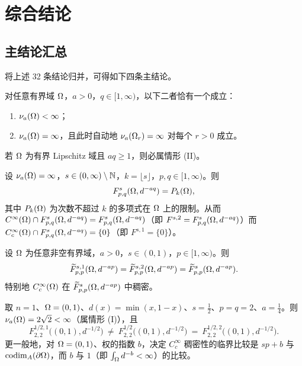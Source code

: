 \section{综合结论}\label{sec:concl}

\subsection{主结论汇总}

将上述 32 条结论归并，可得如下四条主结论。

\begin{theorem}\label{thm:main-dichotomy}
对任意有界域 $\Omega$，$a>0$，$q\in[1,\infty)$，以下二者恰有一个成立：
\begin{enumerate}[label=\textup{(\Roman*)}]
\item $\nu_{a}(\Omega)<\infty$；
\item $\nu_{a}(\Omega)=\infty$，且此时自动地 $\nu_{a}(\Omega_{r})=\infty$ 对每个 $r>0$ 成立。
\end{enumerate}
若 $\Omega$ 为有界 Lipschitz 域且 $aq\ge1$，则必属情形 (II)。
\end{theorem}

\begin{theorem}\label{thm:main-degen}
设 $\nu_{a}(\Omega)=\infty$，$s\in(0,\infty)\setminus\mathbb{N}$，$k=\lfloor s\rfloor$，$p,q\in[1,\infty)$。则
\[
  F^{s}_{p,q}(\Omega,d^{-aq})=P_k(\Omega),
\]
其中 $P_k(\Omega)$ 为次数不超过 $k$ 的多项式在 $\Omega$ 上的限制。从而
$C^\infty(\Omega)\cap F^{s}_{p,q}(\Omega,d^{-aq})=F^{s}_{p,q}(\Omega,d^{-aq})$（即 $F^{s,2}=F^{s}_{p,q}(\Omega,d^{-aq})$）而
$C_c^\infty(\Omega)\cap F^{s}_{p,q}(\Omega,d^{-aq})=\{0\}$（即 $F^{s,1}=\{0\}$）。
\end{theorem}

\begin{theorem}\label{thm:main-strength}
设 $\Omega$ 为任意非空有界域，$a>0$，$s\in(0,1)$，$p\in[1,\infty)$。则
\[
  \widetilde F^{s,1}_{p,p}(\Omega,d^{-ap})=\widetilde F^{s,2}_{p,p}(\Omega,d^{-ap})
  =\widetilde F^s_{p,p}(\Omega,d^{-ap}).
\]
特别地 $C_c^\infty(\Omega)$ 在 $\widetilde F^s_{p,p}(\Omega,d^{-ap})$ 中稠密。
\end{theorem}

\begin{theorem}\label{thm:main-crit}
取 $n=1$、$\Omega=(0,1)$、$d(x)=\min(x,1-x)$、$s=\tfrac12$、$p=q=2$、$a=\tfrac14$。则
$\nu_{a}(\Omega)=2\sqrt2<\infty$（属情形 (I)），且
\[
  F^{1/2,1}_{2,2}\big((0,1),d^{-1/2}\big)\ \neq\ F^{1/2}_{2,2}\big((0,1),d^{-1/2}\big)
  \ =\ F^{1/2,2}_{2,2}\big((0,1),d^{-1/2}\big).
\]
更一般地，对 $\Omega=(0,1)$、权的指数 $b$，决定 $C_c^\infty$ 稠密性的临界比较是
$sp+b$ 与 $\operatorname{codim}_{A}(\partial\Omega)$，而 $b$ 与 $1$（即 $\int_\Omega d^{-b}<\infty$）的比较。
\end{theorem}

